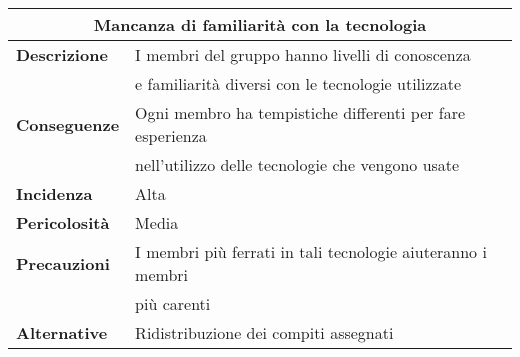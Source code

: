\begin{center}
    \begin{tabularx}{0.8\linewidth}{l|l}
        \multicolumn{2}{c}{\textbf{Mancanza di familiarità con la tecnologia}}                                  \\
        \hline{\textbf{Descrizione}}    & I membri del gruppo hanno livelli di conoscenza                       \\
                                        & e familiarità diversi con le tecnologie utilizzate                    \\
        \textbf{Conseguenze}            & Ogni membro ha tempistiche differenti per fare esperienza             \\                              
                                        & nell'utilizzo delle tecnologie che vengono usate                      \\
        \textbf{Incidenza}              & Alta                                                                  \\
        \textbf{Pericolosità}           & Media                                                                 \\
        \textbf{Precauzioni}            & I membri più ferrati in tali tecnologie aiuteranno i membri           \\ 
                                        & più carenti                                                           \\
        \textbf{Alternative}            & Ridistribuzione dei compiti assegnati                                 \\ 
    \end{tabularx}
\end{center}

